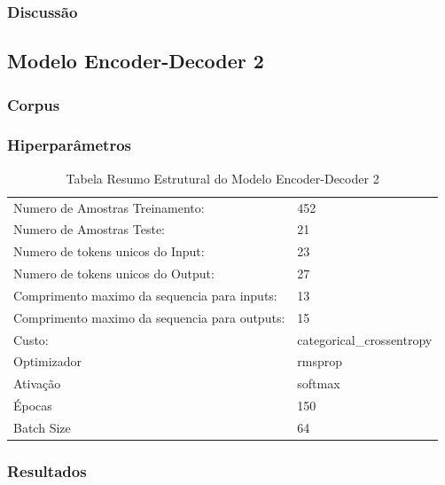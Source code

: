 \subsubsection{Discussão}



\subsection{Modelo Encoder-Decoder 2}

\subsubsection{Corpus}

\subsubsection{Hiperparâmetros} 

\begin{table}[h]
\centering
\begin{tabular}{ll}
Numero de Amostras Treinamento: & 452 \\
Numero de Amostras Teste: & 21 \\
Numero de tokens unicos do Input: & 23 \\
Numero de tokens unicos do Output: & 27 \\
Comprimento maximo da sequencia para inputs: & 13 \\
Comprimento maximo da sequencia para outputs: & 15 \\
Custo: & categorical\_crossentropy \\
Optimizador & rmsprop \\
Ativação & softmax \\
Épocas & 150 \\
Batch Size & 64
\end{tabular}
\caption{Tabela Resumo Estrutural do Modelo Encoder-Decoder 2}
\label{tab:res1}
\end{table}

\subsubsection{Resultados}

